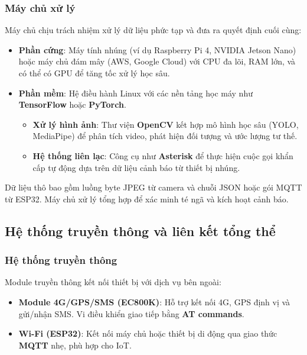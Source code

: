 \subsubsection{Máy chủ xử lý}
Máy chủ chịu trách nhiệm xử lý dữ liệu phức tạp và đưa ra quyết định cuối cùng:
\begin{itemize}
    \item \textbf{Phần cứng}: Máy tính nhúng (ví dụ Raspberry Pi 4, NVIDIA Jetson Nano) hoặc máy chủ đám mây (AWS, Google Cloud) với CPU đa lõi, RAM lớn, và có thể có GPU để tăng tốc xử lý học sâu.
    \item \textbf{Phần mềm}: Hệ điều hành Linux với các nền tảng học máy như \textbf{TensorFlow} hoặc \textbf{PyTorch}.
    \begin{itemize}
        \item \textbf{Xử lý hình ảnh}: Thư viện \textbf{OpenCV} kết hợp mô hình học sâu (YOLO, MediaPipe) để phân tích video, phát hiện đối tượng và ước lượng tư thế.
        \item \textbf{Hệ thống liên lạc}: Công cụ như \textbf{Asterisk} để thực hiện cuộc gọi khẩn cấp tự động dựa trên dữ liệu cảnh báo từ thiết bị nhúng.
    \end{itemize}
\end{itemize}

Dữ liệu thô bao gồm luồng byte JPEG từ camera và chuỗi JSON hoặc gói MQTT từ ESP32. Máy chủ xử lý tổng hợp để xác minh té ngã và kích hoạt cảnh báo.

\subsection{Hệ thống truyền thông và liên kết tổng thể}

\subsubsection{Hệ thống truyền thông}
Module truyền thông kết nối thiết bị với dịch vụ bên ngoài:
\begin{itemize}
    \item \textbf{Module 4G/GPS/SMS (EC800K)}: Hỗ trợ kết nối 4G, GPS định vị và gửi/nhận SMS. Vi điều khiển giao tiếp bằng \textbf{AT commands}.
    \item \textbf{Wi-Fi (ESP32)}: Kết nối máy chủ hoặc thiết bị di động qua giao thức \textbf{MQTT} nhẹ, phù hợp cho IoT.
\end{itemize}


